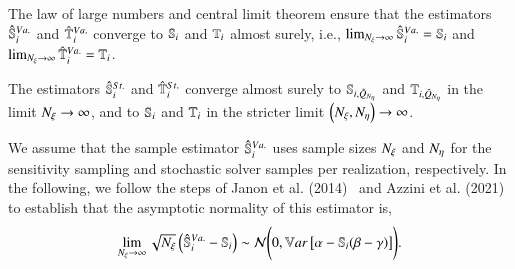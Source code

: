 The law of large numbers and central limit theorem ensure that the estimators $\unpollSsalt{i}$ and $\unpollTsalt{i}$ converge to $\S{i}$ and $\T{i}$ almost surely, i.e., $\lim_{\Nxi \rightarrow \infty} \unpollSsalt{i} = \S{i}$ and $\lim_{\Nxi \rightarrow \infty} \unpollTsalt{i} = \T{i}$.

The estimators $\pollSsalt{i}$ and $\pollTsalt{i}$ converge almost surely to $\Spoll{i}$ and $\Tpoll{i}$ in the limit $\Nxi \rightarrow \infty$, and to $\S{i}$ and $\T{i}$ in the stricter limit $\left( \Nxi, \Neta\right) \rightarrow \infty$.

We assume that the sample estimator $\unpollSsalt{i}$ uses sample sizes $\Nxi$ and $\Neta$ for the sensitivity sampling and stochastic solver samples per realization, respectively.
In the following, we follow the steps of Janon et al. (2014)~\cite{janon-etal-2014} and Azzini et al. (2021)~\cite{azzini-etal-2021} to establish that the asymptotic normality of this estimator is,
\begin{equation}
    \lim_{\Nxi \rightarrow \infty} \sqrt{\Nxi} \left( \unpollSsalt{i} - \S{i} \right) \sim \mathcal{N} \Biggl( 0, \Var{\alpha - \S{i} (\beta - \gamma )} \Biggr) .
\end{equation}

